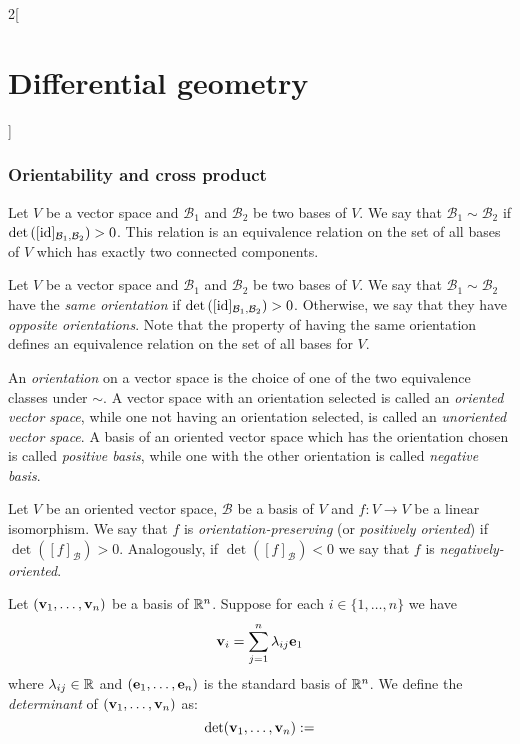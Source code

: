 \documentclass[../../../main_math.tex]{subfiles}
\begin{document}
\begin{multicols}{2}[\section{Differential geometry}]
  \subsubsection{Orientability and cross product}
  \begin{definition}
    Let $V$ be a vector space and $\mathcal{B}_1$ and $\mathcal{B}_2$ be two bases of $V$. We say that $\mathcal{B}_1\sim\mathcal{B}_2$ if $\det\left([\mathrm{id}]_{\mathcal{B}_1,\mathcal{B}_2}\right)>0$. This relation is an equivalence relation on the set of all bases of $V$ which has exactly two connected components.
  \end{definition}
  \begin{definition}
    Let $V$ be a vector space and $\mathcal{B}_1$ and $\mathcal{B}_2$ be two bases of $V$. We say that $\mathcal{B}_1\sim\mathcal{B}_2$ have the \emph{same orientation} if $\det\left([\mathrm{id}]_{\mathcal{B}_1,\mathcal{B}_2}\right)>0$. Otherwise, we say that they have \emph{opposite orientations}. Note that the property of having the same orientation defines an equivalence relation on the set of all bases for $V$.
  \end{definition}
  \begin{definition}
    An \emph{orientation} on a vector space is the choice of one of the two equivalence classes under $\sim$. A vector space with an orientation selected is called an \emph{oriented vector space}, while one not having an orientation selected, is called an \emph{unoriented vector space}. A basis of an oriented vector space which has the orientation chosen is called \emph{positive basis}, while one with the other orientation is called \emph{negative basis}.
  \end{definition}
  \begin{definition}
    Let $V$ be an oriented vector space, $\mathcal{B}$ be a basis of $V$ and $f:V\rightarrow V$ be a linear isomorphism. We say that $f$ is \emph{orientation-preserving} (or \emph{positively oriented}) if $\det \left([f]_{\mathcal{B}}\right)>0$. Analogously, if $\det \left([f]_{\mathcal{B}}\right)<0$ we say that $f$ is \emph{negatively-oriented}.
  \end{definition}
  \begin{definition}
    Let $(\boldsymbol{\mathrm{v}}_1,\ldots,\boldsymbol{\mathrm{v}}_n)$ be a basis of $\mathbb{R}^n$. Suppose for each $i\in\{1,\ldots,n\}$ we have $$\boldsymbol{\mathrm{v}}_i=\sum_{j=1}^n\lambda_{ij}\boldsymbol{\mathrm{e}}_1$$ where $\lambda_{ij}\in\mathbb{R}$ and $(\boldsymbol{\mathrm{e}}_1,\ldots,\boldsymbol{\mathrm{e}}_n)$ is the standard basis of $\mathbb{R}^n$. We define the \emph{determinant} of $(\boldsymbol{\mathrm{v}}_1,\ldots,\boldsymbol{\mathrm{v}}_n)$ as: $$\det(\boldsymbol{\mathrm{v}}_1,\ldots,\boldsymbol{\mathrm{v}}_n):=
$$
\end{definition}
\end{multicols}
\end{document}
